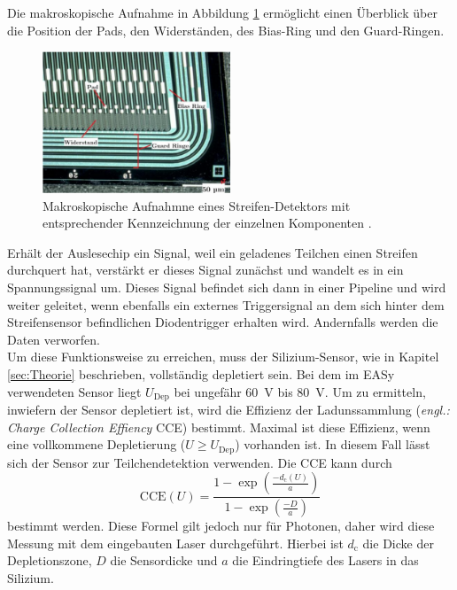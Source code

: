 Die makroskopische Aufnahme in Abbildung \ref{fig:streifendetektor} ermöglicht einen Überblick über die Position der Pads, den Widerständen, des Bias-Ring und den Guard-Ringen.
\begin{figure}[htb]
  \centering
  \includegraphics[width=0.5\textwidth]{graphics/Sensor.png}
  \caption{Makroskopische Aufnahmne eines Streifen-Detektors mit entsprechender Kennzeichnung der einzelnen Komponenten \cite{anleitung}.}
  \label{fig:streifendetektor}
\end{figure}
Erhält der Auslesechip ein Signal, weil ein geladenes Teilchen einen Streifen durchquert hat, verstärkt er dieses Signal zunächst und wandelt es in ein Spannungssignal um. Dieses Signal befindet sich dann in einer Pipeline und wird weiter geleitet, wenn ebenfalls ein externes Triggersignal an dem sich hinter dem Streifensensor befindlichen Diodentrigger erhalten wird. Andernfalls werden die Daten verworfen.\\
Um diese Funktionsweise zu erreichen, muss der Silizium-Sensor, wie in Kapitel \ref{sec:Theorie} beschrieben, vollständig depletiert sein. Bei dem im EASy verwendeten Sensor liegt $U_\text{Dep}$ bei ungefähr \SI{60}{\volt} bis \SI{80}{\volt}. Um zu ermitteln, inwiefern der Sensor depletiert ist, wird die Effizienz der Ladunssammlung (\textit{engl.: Charge Collection Effiency} CCE) bestimmt. Maximal ist diese Effizienz, wenn eine vollkommene Depletierung ($U \ge U_\text{Dep}$) vorhanden ist. In diesem Fall lässt sich der Sensor zur Teilchendetektion verwenden. Die CCE kann durch
\begin{equation}
  \text{CCE}(U) = \frac{1 - \exp\left(\frac{-d_\text{c}(U)}{a}\right)}{1 - \exp\left(\frac{-D}{a}\right)}
  \label{eqn:20}
\end{equation}
bestimmt werden. Diese Formel gilt jedoch nur für Photonen, daher wird diese Messung mit dem eingebauten Laser durchgeführt. Hierbei ist $d_\text{c}$ die Dicke der Depletionszone, $D$ die Sensordicke und $a$ die Eindringtiefe des Lasers in das Silizium.

